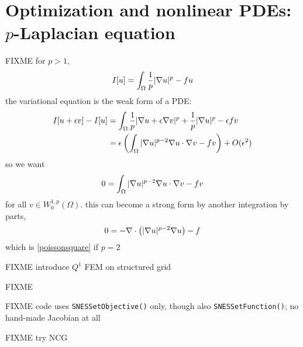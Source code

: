 


\section{Optimization and nonlinear PDEs: $p$-Laplacian equation}

FIXME for $p>1$,
    $$I[u] = \int_\Omega \frac{1}{p} |\nabla u|^p - fu$$
the variational equation is the weak form of a PDE:
\begin{align*}
I[u+\epsilon v] - I[u] &= \int_\Omega \frac{1}{p} |\nabla u + \epsilon \nabla v|^p + \frac{1}{p} |\nabla u|^p - \epsilon f v \\
   &= \epsilon \left(\int_\Omega |\nabla u|^{p-2} \nabla u \cdot \nabla v - f v\right) + O(\epsilon^2)
\end{align*}
so we want
    $$0 = \int_\Omega |\nabla u|^{p-2} \nabla u \cdot \nabla v - f v$$
for all $v \in W^{1,p}_0(\Omega)$.  this can become a strong form by another integration by parts,
    $$0 = - \nabla\cdot\left(|\nabla u|^{p-2} \nabla u\right) - f$$
which is \eqref{poissonsquare} if $p=2$

FIXME introduce $Q^1$ FEM on structured grid

\begin{marginfigure}

\caption{FIXME}
\label{fig:q1hat}
\end{marginfigure}

FIXME code uses \texttt{SNESSetObjective()} only, though also \texttt{SNESSetFunction()}; no hand-made Jacobian at all

FIXME try NCG
